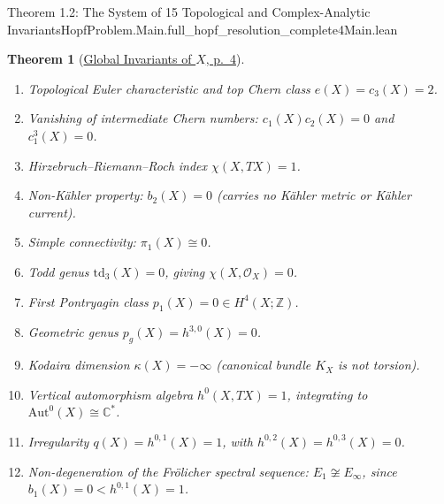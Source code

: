 \documentclass[10pt]{article}
\newtheorem{theorem}{Theorem}[section]
\newcommand{\dbZ}{\mathbb{Z}}
\newcommand{\dbC}{\mathbb{C}}
\newcommand{\cO}{\mathcal{O}}
\newcommand{\Aut}{\mathrm{Aut}}
\gdef\hashchar{#}
\newcommand{\paperref}[2]{\href{https://alpo.ge/s6.pdf\hashchar page=#1}{#2}}
\begin{document}
\begin{comparativeblock}{Theorem 1.2: The System of 15 Topological and Complex-Analytic Invariants}{HopfProblem.Main.full_hopf_resolution_complete}{4}{Main.lean}
\begin{theorem}[\paperref{4}{Global Invariants of $X$, p.~4}]
\begin{enumerate}[label=(\arabic*), itemsep=1pt, parsep=0pt]
    \item Topological Euler characteristic and top Chern class $e(X) = c_3(X) = 2$.
    \item Vanishing of intermediate Chern numbers: $c_1(X)c_2(X) = 0$ and $c_1^3(X) = 0$.
    \item Hirzebruch--Riemann--Roch index $\chi(X, TX) = 1$.
    \item Non-Kähler property: $b_2(X) = 0$ (carries no Kähler metric or Kähler current).
    \item Simple connectivity: $\pi_1(X) \cong 0$.
    \item Todd genus $\mathrm{td}_3(X) = 0$, giving $\chi(X, \cO_X) = 0$.
    \item First Pontryagin class $p_1(X) = 0 \in H^4(X;\dbZ)$.
    \item Geometric genus $p_g(X) = h^{3,0}(X) = 0$.
    \item Kodaira dimension $\kappa(X) = -\infty$ (canonical bundle $K_X$ is not torsion).
    \item Vertical automorphism algebra $h^0(X, TX) = 1$, integrating to $\Aut^0(X) \cong \dbC^*$.
    \item Irregularity $q(X) = h^{0,1}(X) = 1$, with $h^{0,2}(X) = h^{0,3}(X) = 0$.
    \item Non-degeneration of the Frölicher spectral sequence: $E_1 \not\cong E_\infty$, since $b_1(X) = 0 < h^{0,1}(X) = 1$.
\end{enumerate}
\end{theorem}
\end{comparativeblock}
\end{document}
